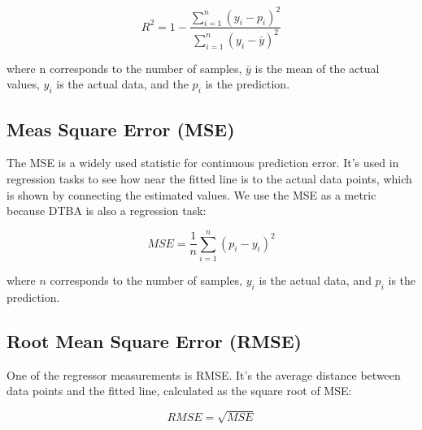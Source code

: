 \begin{equation}
    R^2 = 1 - \frac{\sum_{i=1}^{n} (y_i - p_i)^{2}}{\sum_{i=1}^{n} (y_i - \bar{y})^{2}}
\end{equation}

where n corresponds to the number of samples, $\bar{y}$ is the mean of the actual values, $y_i$ is the actual data, and the $p_i$ is the prediction.

\subsection{Meas Square Error (MSE)}
The MSE is a widely used statistic for continuous prediction error. It's used in regression tasks to see how near the fitted line is to the actual data points, which is shown by connecting the estimated values. We use the MSE as a metric because DTBA is also a regression task:

\begin{equation}
    MSE = \frac{1}{n}\sum_{i=1}^{n} (p_i - y_i)^{2}
\end{equation}

where $n$ corresponds to the number of samples, $y_i$ is the actual data, and $p_i$ is the prediction. 

\subsection{Root Mean Square Error (RMSE)}
One of the regressor measurements is RMSE. It's the average distance between data points and the fitted line, calculated as the square root of MSE:

\begin{equation}
    RMSE = \sqrt{MSE}
\end{equation}
